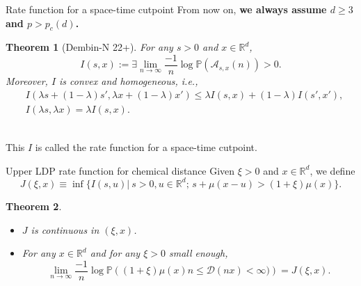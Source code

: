 \documentclass[10pt]{beamer}
\newtheorem{thm}{Theorem}
\newcommand{\R}{\mathbb{R}}
\renewcommand{\P}{\mathbb{P
}}
\newcommand{\kD}{\mathcal{D}}
\def\al#1{\begin{align*}#1\end{align*}}
\begin{document}
\begin{frame}{Rate function for a space-time cutpoint}
  From now on, {\bf we always assume $d\geq 3$ and $p>p_c(d)$.}
\begin{thm}[Dembin-N 22+]
For any $s>0$ and $x\in \R^d$,
$$I(s,x):=\exists \lim_{n\to\infty}\frac{-1}{n}\log{\P\left(\mathcal{A}_{s,x}(n)\right)}>0.$$
Moreover, $I$ is convex and homogeneous, i.e.,
\al{
&I( \lambda s+(1-\lambda)s',\lambda x+(1-\lambda)x')\leq \lambda I( s,x)+(1-\lambda)I(s',x'),\\
&I(\lambda s,\lambda x)=\lambda I(s,x).
}
\end{thm}   
~\\
This $I$ is called the {\color{red} rate function} for a space-time cutpoint.
\end{frame}
\begin{frame}{Upper LDP rate function for chemical distance}
Given $\xi>0$ and $x\in \R^d$, we define
$$J(\xi,x)\equiv \inf\{I(s,u)|~s>0,u\in \R^d;\,s+\mu(x-u)>(1+\xi)\mu(x)\}.$$
\begin{thm}
  \begin{itemize}
  \item $J$ is continuous in $(\xi,x)$.
    \item For any $x\in \R^d$ and for any $\xi>0$ small enough,
      $$\lim_{n\to\infty}\frac{-1}{n}\log{\P\left((1+\xi)\mu(x)n\leq \kD(nx)< \infty)\right)}=J(\xi,x).$$
      \end{itemize}
\end{thm}    
\end{frame}
\end{document}
